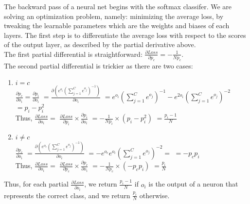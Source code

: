The backward pass of a neural net begins with the softmax classifer.
We are solving an optimization problem, namely: minimizing the average loss,
by tweaking the learnable parameters which are the weights and biases of each layers.
The first step is to differentiate the average loss with respect to the scores of the output layer,
as described by the partial derivative above.\\
The first partial differential is straightforward: $\frac{\partial Loss}{\partial p_c} = -\frac{1}{Np_c}$.\\
The second partial differential is trickier as there are two cases:
\begin{enumerate}[topsep=-12pt]
  
 \item $i = c$\\
   $ \frac{\partial p_c}{\partial o_i} = \frac{\partial p_i}{\partial o_i} $
   $ = \frac{\partial( e^{o_i} (\sum_{j=1}^{C} e^{o_j})^{-1})} {\partial o_i} $
   $ = e^{o_i} (\sum_{j=1}^{C} e^{o_j})^{-1} - e^{2o_i} (\sum_{j=1}^{C} e^{o_j})^{-2} $
   $ = p_i - p_i^2$\\
   Thus, $\frac{\partial Loss}{\partial o_i} = $
   $ \frac{\partial Loss}{\partial p_i} \times \frac{\partial p_i}{\partial o_i} $
   $ =  -\frac{1}{Np_i} \times (p_i - p_i^2) $
   $ = \frac{p_i - 1}{N} $
   
 \item $i \neq c$\\
   $ \frac{\partial p_c}{\partial o_i} $
   $ = \frac{\partial( e^{o_c} (\sum_{j=1}^{C} e^{o_j})^{-1})} {\partial o_i} $
   $ = -e^{o_c}e^{o_i} (\sum_{j=1}^{C} e^{o_j})^{-2} = $
   $ = -p_cp_i $\\
   Thus, $\frac{\partial Loss}{\partial o_i} = $
   $ \frac{\partial Loss}{\partial p_c} \times \frac{\partial p_c}{\partial o_i} $
   $ =  -\frac{1}{Np_c} \times (-p_cp_i) $
   $ = \frac{p_i}{N} $ \\   
\end{enumerate}

Thus, for each partial $\frac {\partial Loss}{\partial o_i}$, we return $\frac{p_i - 1}{N}$ if $o_i$ is the output
of a neuron that represents the correct class, and we return $\frac{p_i}{N}$ otherwise.





